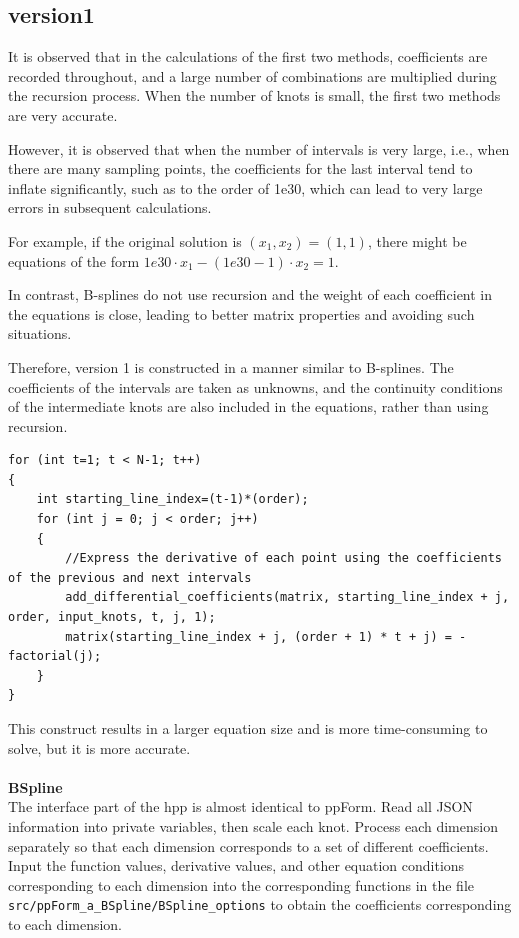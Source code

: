 \documentclass[a4paper]{article}
\begin{document}
\subsection*{version1}

It is observed that in the calculations of the first two methods, coefficients are recorded throughout, and a large number of combinations are multiplied during the recursion process. When the number of knots is small, the first two methods are very accurate.

However, it is observed that when the number of intervals is very large, i.e., when there are many sampling points, the coefficients for the last interval tend to inflate significantly, such as to the order of 1e30, which can lead to very large errors in subsequent calculations.

For example, if the original solution is $(x_1,x_2)=(1,1)$, there might be equations of the form $1e30 \cdot x_1 - (1e30 - 1) \cdot x_2 = 1$.

In contrast, B-splines do not use recursion and the weight of each coefficient in the equations is close, leading to better matrix properties and avoiding such situations.

Therefore, version 1 is constructed in a manner similar to B-splines. The coefficients of the intervals are taken as unknowns, and the continuity conditions of the intermediate knots are also included in the equations, rather than using recursion.

\begin{verbatim}
for (int t=1; t < N-1; t++)
{
    int starting_line_index=(t-1)*(order);
    for (int j = 0; j < order; j++)
    {
        //Express the derivative of each point using the coefficients of the previous and next intervals
        add_differential_coefficients(matrix, starting_line_index + j, order, input_knots, t, j, 1);
        matrix(starting_line_index + j, (order + 1) * t + j) = -factorial(j);
    }
}
\end{verbatim}

This construct results in a larger equation size and is more time-consuming to solve, but it is more accurate.\\
\\
\textbf{BSpline}\\
The interface part of the hpp is almost identical to ppForm. Read all JSON information into private variables, then scale each knot. Process each dimension separately so that each dimension corresponds to a set of different coefficients. Input the function values, derivative values, and other equation conditions corresponding to each dimension into the corresponding functions in the file \texttt{src/ppForm\_a\_BSpline/BSpline\_options} to obtain the coefficients corresponding to each dimension.
\end{document}
